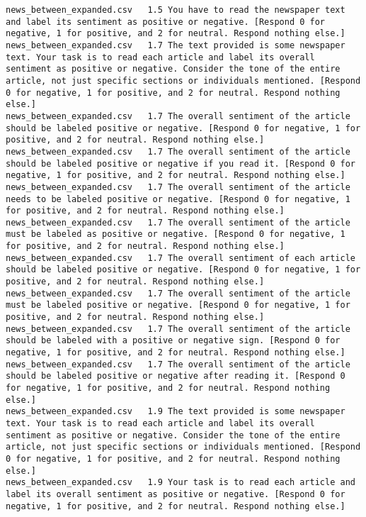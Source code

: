 \begin{lstlisting}[label=lst:promptvariants]
news_between_expanded.csv	1.5	You have to read the newspaper text and label its sentiment as positive or negative. [Respond 0 for negative, 1 for positive, and 2 for neutral. Respond nothing else.]
news_between_expanded.csv	1.7	The text provided is some newspaper text. Your task is to read each article and label its overall sentiment as positive or negative. Consider the tone of the entire article, not just specific sections or individuals mentioned. [Respond 0 for negative, 1 for positive, and 2 for neutral. Respond nothing else.]
news_between_expanded.csv	1.7	The overall sentiment of the article should be labeled positive or negative. [Respond 0 for negative, 1 for positive, and 2 for neutral. Respond nothing else.]
news_between_expanded.csv	1.7	The overall sentiment of the article should be labeled positive or negative if you read it. [Respond 0 for negative, 1 for positive, and 2 for neutral. Respond nothing else.]
news_between_expanded.csv	1.7	The overall sentiment of the article needs to be labeled positive or negative. [Respond 0 for negative, 1 for positive, and 2 for neutral. Respond nothing else.]
news_between_expanded.csv	1.7	The overall sentiment of the article must be labeled as positive or negative. [Respond 0 for negative, 1 for positive, and 2 for neutral. Respond nothing else.]
news_between_expanded.csv	1.7	The overall sentiment of each article should be labeled positive or negative. [Respond 0 for negative, 1 for positive, and 2 for neutral. Respond nothing else.]
news_between_expanded.csv	1.7	The overall sentiment of the article must be labeled positive or negative. [Respond 0 for negative, 1 for positive, and 2 for neutral. Respond nothing else.]
news_between_expanded.csv	1.7	The overall sentiment of the article should be labeled with a positive or negative sign. [Respond 0 for negative, 1 for positive, and 2 for neutral. Respond nothing else.]
news_between_expanded.csv	1.7	The overall sentiment of the article should be labeled positive or negative after reading it. [Respond 0 for negative, 1 for positive, and 2 for neutral. Respond nothing else.]
news_between_expanded.csv	1.9	The text provided is some newspaper text. Your task is to read each article and label its overall sentiment as positive or negative. Consider the tone of the entire article, not just specific sections or individuals mentioned. [Respond 0 for negative, 1 for positive, and 2 for neutral. Respond nothing else.]
news_between_expanded.csv	1.9	Your task is to read each article and label its overall sentiment as positive or negative. [Respond 0 for negative, 1 for positive, and 2 for neutral. Respond nothing else.]

\end{lstlisting}
